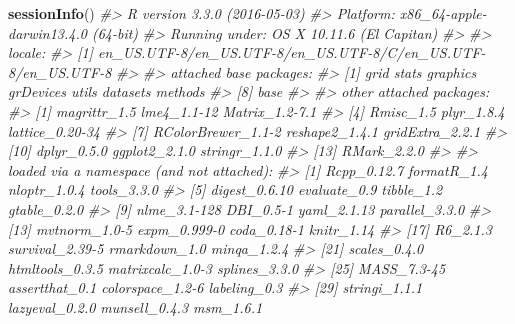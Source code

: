 \documentclass[]{article}
\newenvironment{Shaded}{\begin{snugshade}}{\end{snugshade}}
\newcommand{\KeywordTok}[1]{\textcolor[rgb]{0.13,0.29,0.53}{\textbf{{#1}}}}
\newcommand{\CommentTok}[1]{\textcolor[rgb]{0.56,0.35,0.01}{\textit{{#1}}}}
\newcommand{\NormalTok}[1]{{#1}}
\begin{document}
\begin{Shaded}
\begin{Highlighting}[]
\KeywordTok{sessionInfo}\NormalTok{()}
\CommentTok{#> R version 3.3.0 (2016-05-03)}
\CommentTok{#> Platform: x86_64-apple-darwin13.4.0 (64-bit)}
\CommentTok{#> Running under: OS X 10.11.6 (El Capitan)}
\CommentTok{#> }
\CommentTok{#> locale:}
\CommentTok{#> [1] en_US.UTF-8/en_US.UTF-8/en_US.UTF-8/C/en_US.UTF-8/en_US.UTF-8}
\CommentTok{#> }
\CommentTok{#> attached base packages:}
\CommentTok{#> [1] grid      stats     graphics  grDevices utils     datasets  methods  }
\CommentTok{#> [8] base     }
\CommentTok{#> }
\CommentTok{#> other attached packages:}
\CommentTok{#>  [1] magrittr_1.5       lme4_1.1-12        Matrix_1.2-7.1    }
\CommentTok{#>  [4] Rmisc_1.5          plyr_1.8.4         lattice_0.20-34   }
\CommentTok{#>  [7] RColorBrewer_1.1-2 reshape2_1.4.1     gridExtra_2.2.1   }
\CommentTok{#> [10] dplyr_0.5.0        ggplot2_2.1.0      stringr_1.1.0     }
\CommentTok{#> [13] RMark_2.2.0       }
\CommentTok{#> }
\CommentTok{#> loaded via a namespace (and not attached):}
\CommentTok{#>  [1] Rcpp_0.12.7      formatR_1.4      nloptr_1.0.4     tools_3.3.0     }
\CommentTok{#>  [5] digest_0.6.10    evaluate_0.9     tibble_1.2       gtable_0.2.0    }
\CommentTok{#>  [9] nlme_3.1-128     DBI_0.5-1        yaml_2.1.13      parallel_3.3.0  }
\CommentTok{#> [13] mvtnorm_1.0-5    expm_0.999-0     coda_0.18-1      knitr_1.14      }
\CommentTok{#> [17] R6_2.1.3         survival_2.39-5  rmarkdown_1.0    minqa_1.2.4     }
\CommentTok{#> [21] scales_0.4.0     htmltools_0.3.5  matrixcalc_1.0-3 splines_3.3.0   }
\CommentTok{#> [25] MASS_7.3-45      assertthat_0.1   colorspace_1.2-6 labeling_0.3    }
\CommentTok{#> [29] stringi_1.1.1    lazyeval_0.2.0   munsell_0.4.3    msm_1.6.1}
\end{Highlighting}
\end{Shaded}
\end{document}
